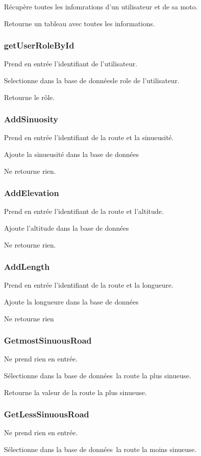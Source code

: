 \documentclass[a4paper]{article}
\newcommand{\bdd}{base de données}
\begin{document}
Récupère toutes les infomrations d'un utilisateur et de sa moto.

Retourne un tableau avec toutes les informations.


\subsubsection{getUserRoleById}
Prend en entrée l'identifiant de l'utilisateur.

Selectionne dans la \bdd le role de l'utilisateur.

Retourne le rôle.

\subsubsection{AddSinuosity}
Prend en entrée l'identifiant de la route et la sinueusité.

Ajoute la sinueusité dans la \bdd

Ne retourne rien.

\subsubsection{AddElevation}
Prend en entrée l'identifiant de la route et l'altitude.

Ajoute l'altitude dans la \bdd

Ne retourne rien.

\subsubsection{AddLength}
Prend en entrée l'identifiant de la route et la longueure.

Ajoute la longueure dans la \bdd

Ne retourne rien

\subsubsection{GetmostSinuousRoad}
Ne prend rien en entrée.

Sélectionne dans la \bdd \ la route la plus sinueuse.

Retourne la valeur de la route la plus sinueuse.

\subsubsection{GetLessSinuousRoad}
Ne prend rien en entrée.

Sélectionne dans la \bdd \ la route la moins sinueuse.
\end{document}
